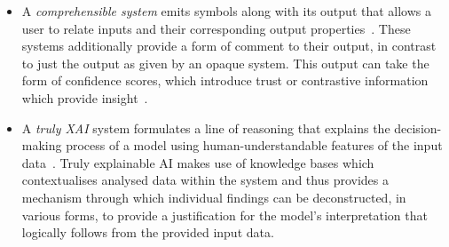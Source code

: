 \begin{itemize}
\item A \emph{comprehensible system} emits symbols along with its output that allows a user to relate inputs and their corresponding output properties~\cite{doran17}.%
These systems additionally provide a form of comment to their output, in contrast to just the output as given by an opaque system. This output can take the form of confidence scores, which introduce trust or contrastive information which provide insight~\cite{chari20}.
  
\item A \emph{truly XAI} system formulates a line of reasoning that explains the decision-making process of a model using human-understandable features of the input data~\cite{doran17}. Truly explainable AI makes use of knowledge bases which contextualises analysed data within the system and thus provides a mechanism through which individual findings can be deconstructed, in various forms, to provide a justification for the model’s interpretation that logically follows from the provided input data.

\end{itemize}

